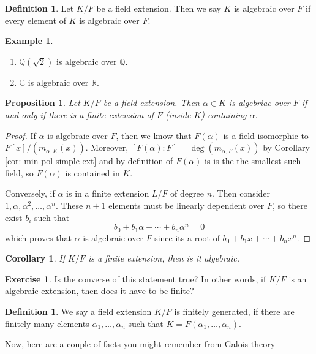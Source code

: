 \documentclass[11pt,a4paper]{report}
\theoremstyle{plain}
\newtheorem{cor}[subsection]{Corollary}
\newtheorem{prop}[subsection]{Proposition}
\theoremstyle{definition}
\newtheorem{defn}[subsection]{Definition}
\newtheorem{exmp}[subsection]{Example}
\theoremstyle{definition}
\newtheorem{question}[subsection]{Exercise}
\newcommand{\RR}{\mathbb{R}}
\def\CC{\mathbb{C}}
\def\QQ{\mathbb{Q}}
\def \a{\alpha}
\begin{document}
	
	\begin{defn}
		Let $K/F$ be a field extension. Then we say $K$ is algebraic over $F$ if every element of $K$ is algebraic over $F$.
	\end{defn}
	
	\begin{exmp}
		\begin{enumerate}
			\item $\QQ(\sqrt{2})$ is algebraic over $\QQ$.
			\item $\CC$ is algebraic over $\RR$.
		\end{enumerate}
	\end{exmp}
	
	\begin{prop}
		Let $K/F$ be a field extension. Then $\a \in K$ is algebriac over $F$ if and only if there is a finite extension of $F$ (inside $K$) containing $\a$.
	\end{prop}
	
	\begin{proof}
		If $\a$ is algebraic over $F$, then we know that $F(\a)$ is a field isomorphic to $F[x]/(m_{\a,K}(x))$. Moreover, $[F(\a):F]=\deg(m_{\a,F}(x))$ by Corollary \ref{cor: min pol simple ext} and by definition of $F(\a)$ is is the the smallest such field, so $F(\a)$ is contained in $K$.
		
		Conversely, if $\a$ is in a finite extension $L/F$ of degree $n$. Then consider $1,\a,\a^2,\dots,\a^n$. These $n+1$ elements must be linearly dependent over $F$, so there exist $b_i$ such that \[b_0+b_1\a+\cdots+b_n\a^n=0\] which proves that $\a$ is algebraic over $F$ since its a root of $b_0+b_1x+\cdots+b_n x^n$.
	\end{proof}
	
	\begin{cor}\label{cor: fin ext is alg}
		If $K/F$ is a finite extension, then is it algebraic.
	\end{cor}
	\begin{question}
		Is the converse of this statement true? In other words, if $K/F$ is an algebraic extension, then does it have to be finite?
	\end{question}
	
	
	\begin{defn}
		We say a field extension $K/F$ is finitely generated, if there are finitely many elements $\a_1,\dots,\a_n$ such that $K=F(\a_1,\dots,\a_n)$.
	\end{defn}
	
	Now, here are a couple of facts you might remember from Galois theory
	
\end{document}
